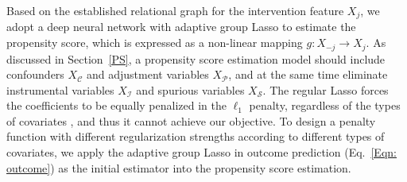 \documentclass[letterpaper]{article} %
\theoremstyle{definition}
\theoremstyle{remark}
\begin{document}
Based on the established relational graph for the intervention feature $X_j$, we adopt a deep neural network with adaptive group Lasso to estimate the propensity score, which is expressed as a non-linear mapping $g: X_{-j} \rightarrow X_j$. As discussed in Section~\ref{PS}, a propensity score estimation model should include confounders $X_\mathcal{C}$ and adjustment variables $X_\mathcal{P}$, and at the same time eliminate instrumental variables $X_\mathcal{I}$ and spurious variables $X_\mathcal{S}$. The regular Lasso forces the coefficients to be equally penalized in the $\ell_1$ penalty, regardless of the types of covariates \cite{zou2006adaptive}, and thus it cannot achieve our objective. To design a penalty function with different regularization strengths according to different types of covariates, we apply the adaptive group Lasso in outcome prediction (Eq.~\eqref{Eqn: outcome}) as the initial estimator into the propensity score estimation.
\end{document}
